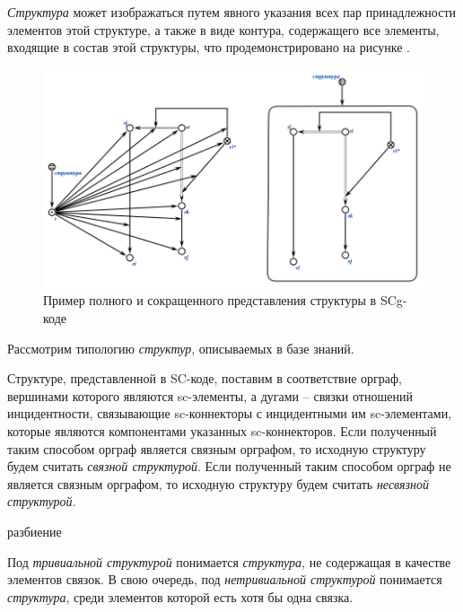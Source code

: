 \textit{Структура} может изображаться путем явного указания всех пар принадлежности элементов этой структуре, а также в виде контура, содержащего все элементы, входящие в состав этой структуры, что продемонстрировано на рисунке \textit{}.

\begin{figure}[H]
	\includegraphics[scale=0.7]{author/part2/figures/chapter_kb/structure.png}
	\caption{Пример полного и сокращенного представления структуры в SCg-коде}
	\label{fig:structure_example}
\end{figure}


Рассмотрим типологию \textit{структур}, описываемых в базе знаний.

Структуре, представленной в SC-коде, поставим в соответствие орграф, вершинами которого являются sc-элементы, а дугами – связки отношений инцидентности, связывающие sc-коннекторы с инцидентными им sc-элементами, которые являются компонентами указанных sc-коннекторов. Если полученный таким способом орграф является связным орграфом, то исходную структуру будем считать \textit{связной структурой}. Если полученный таким способом орграф не является связным орграфом, то исходную структуру будем считать \textit{несвязной структурой}.

\begin{SCn}
	\begin{scnrelfromset}{разбиение}
	\end{scnrelfromset}
\end{SCn}

Под \textit{тривиальной структурой} понимается \textit{структура}, не содержащая в качестве элементов связок. В свою очередь, под \textit{нетривиальной структурой} понимается \textit{структура}, среди элементов которой есть хотя бы одна связка.

